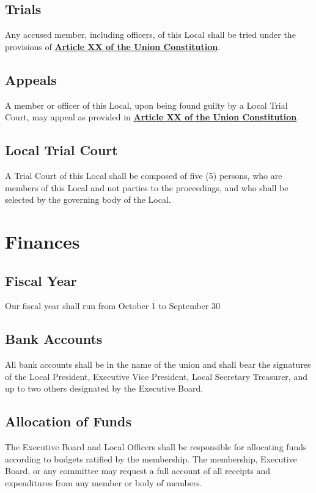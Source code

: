 \documentclass[11pt]{article}
\let\oldhref\href
\renewcommand{\href}[2]{\oldhref{#1}{\bfseries#2}}
\begin{document}
\subsection{Trials}
Any accused member, including officers, of this Local shall be tried under the provisions of \href{https://cwa-union.org/for-locals/cwa-constitution\#A20}{Article XX of the Union  Constitution}.

\subsection{Appeals}
A member or officer of this Local, upon being found guilty by a Local Trial Court, may appeal as provided in \href{https://cwa-union.org/for-locals/cwa-constitution\#A20}{Article XX of the Union Constitution}.

\subsection{Local Trial Court}
A Trial Court of this Local shall be composed of five (5) persons, who are members of this Local and not parties to the proceedings, and who shall be selected by the governing body of the Local.

\section{Finances}
\subsection{Fiscal Year}
Our fiscal year shall run from October 1 to September 30

\subsection{Bank Accounts}
All bank accounts shall be in the name of the union and shall bear the signatures of the Local President, Executive Vice President, Local Secretary Treasurer, and up to two others designated by the Executive Board.

\subsection{Allocation of Funds}
The Executive Board and Local Officers shall be responsible for allocating funds according to budgets ratified by the membership. The membership, Executive Board, or any committee may request a full account of all receipts and expenditures from any member or body of members.
\end{document}
